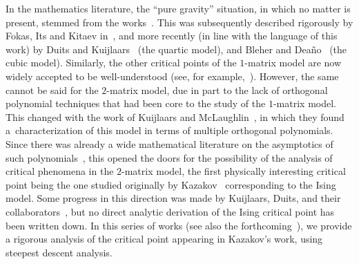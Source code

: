 \documentclass[10pt,a4paper]{amsart}
\numberwithin{equation}{section}
\begin{document}
In the mathematics literature, the ``pure gravity'' situation, in which no matter is present, stemmed from the works~\cite{DS,GM1,KM}. This was subsequently described rigorously by Fokas, Its and Kitaev in~\cite{FIK1,FIK2}, and more recently (in line with the language of this work) by Duits and Kuijlaars~\cite{DK0} (the quartic model), and Bleher and Dea\~{n}o~\cite{BleherDeano} (the cubic model). Similarly, the other critical points of the $1$-matrix model are now widely accepted to be well-understood (see, for example,~\cite{CV}). However, the same cannot be said for the $2$-matrix model, due in part to the lack of orthogonal polynomial techniques that had been core to the study of the $1$-matrix model. This changed with the work of Kuijlaars and McLaughlin~\cite{KM}, in which they found a~characterization of this model in terms of multiple orthogonal polynomials. Since there was already a wide mathematical literature on the asymptotics of such polynomials~\cite{Aptekarev,NikishinSorokin,VanAssche}, this opened the doors for the possibility of
the analysis of critical phenomena in the $2$-matrix model, the first physically interesting critical point being the one studied originally by Kazakov~\cite{Kazakov1} corresponding to the Ising model. Some progress in this direction was made by Kuijlaars, Duits, and their collaborators~\cite{DG,DGK,DK1,DKM}, but no direct analytic derivation of the Ising critical point has been
written down. In this series of works (see also the forthcoming~\cite{DHL3, DHL2}), we provide a rigorous analysis of the critical point appearing in Kazakov's work, using steepest descent analysis.
\end{document}
